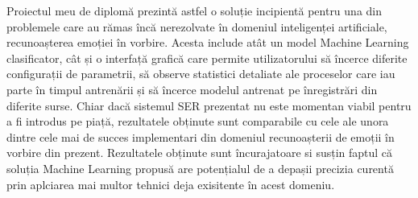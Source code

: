 \documentclass[a4paper,12pt]{book}
\begin{document}
		Proiectul meu de diplomă prezintă astfel o soluție incipientă pentru una din problemele care au rămas încă nerezolvate în domeniul inteligenței artificiale, recunoașterea emoției în vorbire. Acesta include atât un model Machine Learning clasificator, cât și o interfață grafică care permite utilizatorului să încerce diferite configurații de parametrii, să observe statistici detaliate ale proceselor care iau parte în timpul antrenării și să încerce modelul antrenat pe înregistrări din diferite surse. Chiar dacă sistemul SER prezentat nu este momentan viabil pentru a fi introdus pe piață, rezultatele obținute sunt comparabile cu cele ale unora dintre cele mai de succes implementari din domeniul recunoașterii de emoții în vorbire din prezent. Rezultatele obținute sunt încurajatoare si susțin faptul că soluția Machine Learning propusă are potențialul de a depașii precizia curentă prin aplciarea mai multor tehnici deja exisitente în acest domeniu.		
			
		\renewcommand{\clearpage}{}
		\printbibliography[title={Bibliografie},notcategory=cited,resetnumbers=true]
		\printbibliography[title={Referințe},category=cited,resetnumbers=true]
		\newpage		
		
		\clearpage
\end{document}
